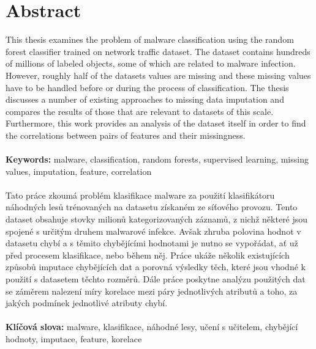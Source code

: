 \documentclass[11pt]{article}
\begin{document}
  \section*{Abstract}
    \thispagestyle{empty}
    This thesis examines the problem of malware classification using the random forest classifier trained on network traffic dataset. The dataset contains hundreds of millions of labeled objects, some of which are related to malware infection. However, roughly half of the datasets values are missing and these missing values have to be handled before or during the process of classification. The thesis discusses a number of existing approaches to missing data imputation and compares the results of those that are relevant to datasets of this scale. Furthermore, this work provides an analysis of the dataset itself in order to find the correlations between pairs of features and their missingness.
    \\~\\
    {\bf Keywords:} malware, classification, random forests, supervised learning, missing values, imputation, feature, correlation 
    \\~\\
    Tato práce zkoumá problém klasifikace malware za použití klasifikátoru náhodných lesů trénovaných na datasetu získaném ze síťového provozu. Tento dataset obsahuje stovky milionů kategorizovaných záznamů, z nichž některé jsou spojené s určitým druhem malwarové infekce. Avšak zhruba polovina hodnot v datasetu chybí a s těmito chybějícími hodnotami je nutno se vypořádat, ať už před procesem klasifikace, nebo během něj. Práce ukáže několik existujících způsobů imputace chybějících dat a porovná výsledky těch, které jsou vhodné k použití s datasetem těchto rozměrů. Dále práce poskytne analýzu použitých dat se záměrem nalezení míry korelace mezi páry jednotlivých atributů a toho, za jakých podmínek jednotlivé atributy chybí.
    \\~\\
    {\bf Klíčová slova:} malware, klasifikace, náhodné lesy, učení s učitelem, chybějící hodnoty, imputace, feature, korelace
  \newpage
  {\hypersetup{hidelinks}
  \thispagestyle{empty}
  \tableofcontents}
  \thispagestyle{empty}
  \newpage
\end{document}
